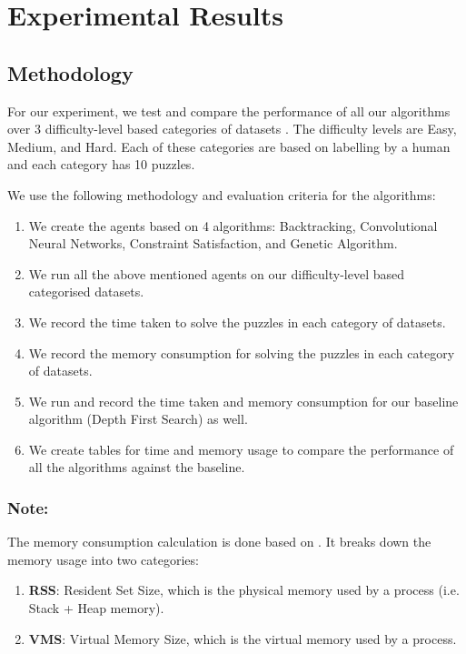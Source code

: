 \section{Experimental Results}

\subsection{Methodology}
For our experiment, we test and compare the performance of all our algorithms over 3 difficulty-level based categories of datasets \cite{bib_rateddataset}. The difficulty levels are Easy, Medium, and Hard. Each of these categories are based on labelling by a human and each category has 10 puzzles.

We use the following methodology and evaluation criteria for the algorithms:
\begin{enumerate}
    \item We create the agents based on 4 algorithms: Backtracking, Convolutional Neural Networks, Constraint Satisfaction, and Genetic Algorithm.
    \item We run all the above mentioned agents on our difficulty-level based categorised datasets.
    \item We record the time taken to solve the puzzles in each category of datasets.
    \item We record the memory consumption for solving the puzzles in each category of datasets.
    \item We run and record the time taken and memory consumption for our baseline algorithm (Depth First Search) as well.
    \item We create tables for time and memory usage to compare the performance of all the algorithms against the baseline.
\end{enumerate}

\subsubsection{Note:} The memory consumption calculation is done based on \cite{bib_memoryeval}. It breaks down the memory usage into two categories:
\begin{enumerate}
    \item \textbf{RSS}: Resident Set Size, which is the physical memory used by a process (i.e. Stack + Heap memory).
    \item \textbf{VMS}: Virtual Memory Size, which is the virtual memory used by a process.
\end{enumerate}

